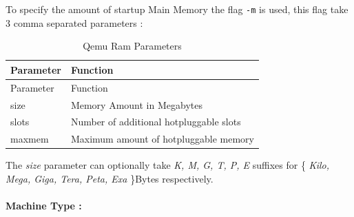 \documentclass[
  14pt,
  english,
  a4paper,
]{scrreprt}
\begin{document}
To specify the amount of startup Main Memory the flag \texttt{-m} is
used, this flag take 3 comma separated parameters :

\hypertarget{tbl:qemu_mem_param}{}
\begin{longtable}[]{@{}ll@{}}
\caption{\label{tbl:qemu_mem_param}Qemu Ram Parameters}\tabularnewline
\toprule
\begin{minipage}[b]{0.16\columnwidth}\raggedright
Parameter\strut
\end{minipage} & \begin{minipage}[b]{0.55\columnwidth}\raggedright
Function\strut
\end{minipage}\tabularnewline
\midrule
\endfirsthead
\toprule
\begin{minipage}[b]{0.16\columnwidth}\raggedright
Parameter\strut
\end{minipage} & \begin{minipage}[b]{0.55\columnwidth}\raggedright
Function\strut
\end{minipage}\tabularnewline
\midrule
\endhead
\begin{minipage}[t]{0.16\columnwidth}\raggedright
size\strut
\end{minipage} & \begin{minipage}[t]{0.55\columnwidth}\raggedright
Memory Amount in Megabytes\strut
\end{minipage}\tabularnewline
\begin{minipage}[t]{0.16\columnwidth}\raggedright
slots\strut
\end{minipage} & \begin{minipage}[t]{0.55\columnwidth}\raggedright
Number of additional hotpluggable slots\strut
\end{minipage}\tabularnewline
\begin{minipage}[t]{0.16\columnwidth}\raggedright
maxmem\strut
\end{minipage} & \begin{minipage}[t]{0.55\columnwidth}\raggedright
Maximum amount of hotpluggable memory\strut
\end{minipage}\tabularnewline
\bottomrule
\end{longtable}

The \emph{size} parameter can optionally take \emph{K, M, G, T, P, E}
suffixes for \{ \emph{Kilo, Mega, Giga, Tera, Peta, Exa} \}Bytes
respectively.

\hypertarget{machine-type}{%
\paragraph*{Machine Type :}\label{machine-type}}
\end{document}
